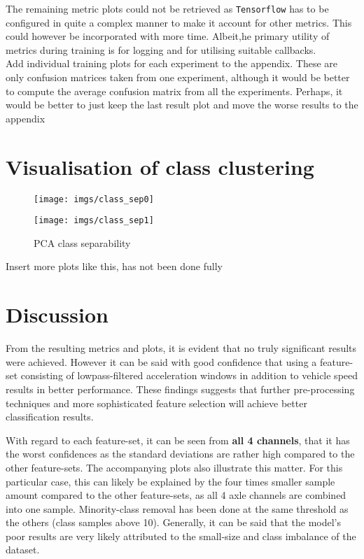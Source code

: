 The remaining metric plots could not be retrieved as \verb|Tensorflow| has to be configured in quite a complex manner to make it account for other metrics. This could however be incorporated with more time. Albeit,he primary utility of metrics during training is for logging and for utilising suitable callbacks.\\

Add individual training plots for each experiment to the appendix. These are only confusion matrices taken from one experiment, although it would be better to compute the average confusion matrix from all the experiments. Perhaps, it would be better to just keep the last result plot and move the worse results to the appendix\todo{}

\section{Visualisation of class clustering}
\begin{figure}[H]
	\centering	
	\texttt{[image: imgs/class\_sep0]}
	
	\texttt{[image: imgs/class\_sep1]}
	\caption{PCA class separability}
\end{figure}

Insert more plots like this, has not been done fully\todo{}

\newpage
\section{Discussion}
From the resulting metrics and plots, it is evident that no truly significant results were achieved. However it can be said with good confidence that using a feature-set consisting of lowpass-filtered acceleration windows in addition to vehicle speed results in better performance. These findings suggests that further pre-processing techniques and more sophisticated feature selection will achieve better classification results. 

With regard to each feature-set, it can be seen from \textbf{all 4 channels}, that it has the worst confidences as the standard deviations are rather high compared to the other feature-sets. The accompanying plots also illustrate this matter. For this particular case, this can likely be explained by the four times smaller sample amount compared to the other feature-sets, as all 4 axle channels are combined into one sample. Minority-class removal has been done at the same threshold as the others (class samples above 10). Generally, it can be said that the model's poor results are very likely attributed to the small-size and class imbalance of the dataset.

